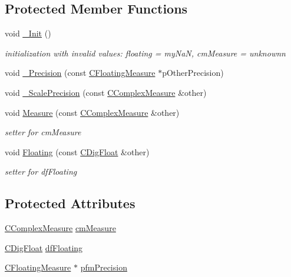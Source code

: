 \subsection*{Protected Member Functions}
\begin{DoxyCompactItemize}
\item 
void \hyperlink{classCFloatingMeasure_a1e8a7467d6435c4cf349198804617623}{\+\_\+\+Init} ()
\begin{DoxyCompactList}\small\item\em initialization with invalid values\+: floating = my\+NaN, cm\+Measure = unknownn \end{DoxyCompactList}\item 
void \hyperlink{classCFloatingMeasure_a8e16f55f29d0d4c4148307a1f5953fe3}{\+\_\+\+Precision} (const \hyperlink{classCFloatingMeasure}{C\+Floating\+Measure} $\ast$p\+Other\+Precision)
\item 
void \hyperlink{classCFloatingMeasure_a9eb8748502d6f118fa631749165a6d6e}{\+\_\+\+Scale\+Precision} (const \hyperlink{classCComplexMeasure}{C\+Complex\+Measure} \&other)
\item 
void \hyperlink{classCFloatingMeasure_af35c54ac06b1c8ddca86390360559548}{Measure} (const \hyperlink{classCComplexMeasure}{C\+Complex\+Measure} \&other)
\begin{DoxyCompactList}\small\item\em setter for cm\+Measure \end{DoxyCompactList}\item 
void \hyperlink{classCFloatingMeasure_aa33fe952e9c01f5f76cef5e6f0d03864}{Floating} (const \hyperlink{classCDigFloat}{C\+Dig\+Float} \&other)
\begin{DoxyCompactList}\small\item\em setter for df\+Floating \end{DoxyCompactList}\end{DoxyCompactItemize}
\subsection*{Protected Attributes}
\begin{DoxyCompactItemize}
\item 
\hyperlink{classCComplexMeasure}{C\+Complex\+Measure} \hyperlink{classCFloatingMeasure_a3a23946016d1b7f41a1ecf05f4d5d5c6}{cm\+Measure}
\item 
\hyperlink{classCDigFloat}{C\+Dig\+Float} \hyperlink{classCFloatingMeasure_aa0cec9966c6c08db75c493e44396cfc2}{df\+Floating}
\item 
\hyperlink{classCFloatingMeasure}{C\+Floating\+Measure} $\ast$ \hyperlink{classCFloatingMeasure_a6bc7bd6e563e69cbf29692cd97153115}{pfm\+Precision}
\end{DoxyCompactItemize}
